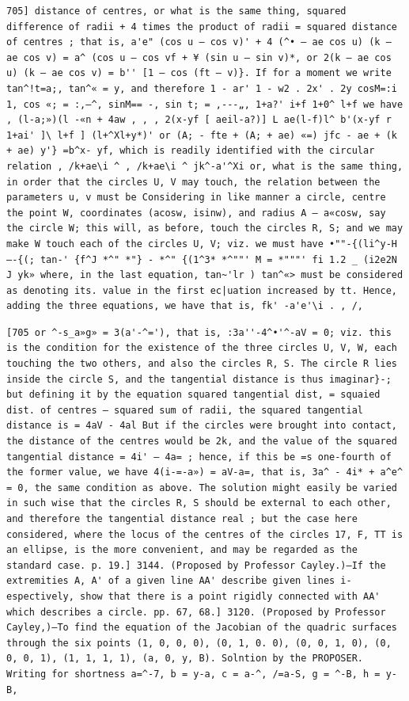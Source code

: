 \documentclass[11pt,a4paper]{book}
\begin{document}
\newpage
\setcounter{page}{567}
\begin{verbatim}
705] distance of centres, or what is the same thing, squared difference of radii + 4 times the product of radii = squared distance of centres ; that is, a'e" (cos u — cos v)' + 4 (^• — ae cos u) (k — ae cos v) = a^ (cos u — cos vf + ¥ (sin u — sin v)*, or 2(k — ae cos u) (k — ae cos v) = b'' [1 — cos (ft — v)}. If for a moment we write tan^!t=a;, tan^« = y, and therefore 1 - ar' 1 - w2 . 2x' . 2y cosM=:i 1, cos «; = :,—^, sinM== -, sin t; = ,---„, 1+a?' i+f 1+0^ l+f we have , (l-a;»)(l -«n + 4aw , , , 2(x-yf [ aeil-a?)] L ae(l-f)l^ b'(x-yf r 1+ai' ]\ l+f ] (l+^Xl+y*)' or (A; - fte + (A; + ae) «=) jfc - ae + (k + ae) y'} =b^x- yf, which is readily identified with the circular relation , /k+ae\i ^ , /k+ae\i ^ jk^-a'^Xi or, what is the same thing, in order that the circles U, V may touch, the relation between the parameters u, v must be Considering in like manner a circle, centre the point W, coordinates (acosw, isinw), and radius A — a«cosw, say the circle W; this will, as before, touch the circles R, S; and we may make W touch each of the circles U, V; viz. we must have •""-{(li^y-H—-{(; tan-' {f^J *^" *"} - *^" {(1^3* *^""' M = *"""' fi 1.2 _ (i2e2N J yk» where, in the last equation, tan~'lr ) tan^«> must be considered as denoting its. value in the first ec|uation increased by tt. Hence, adding the three equations, we have that is, fk' -a'e'\i . , /, 
\end{verbatim}

\newpage
\setcounter{page}{568}
\begin{verbatim}
[705 or ^-s_a»g» = 3(a'-^='), that is, :3a''-4^•'^-aV = 0; viz. this is the condition for the existence of the three circles U, V, W, each touching the two others, and also the circles R, S. The circle R lies inside the circle S, and the tangential distance is thus imaginar}-; but defining it by the equation squared tangential dist, = squaied dist. of centres — squared sum of radii, the squared tangential distance is = 4aV - 4al But if the circles were brought into contact, the distance of the centres would be 2k, and the value of the squared tangential distance = 4i' — 4a= ; hence, if this be =s one-fourth of the former value, we have 4(i-=-a») = aV-a=, that is, 3a^ - 4i* + a^e^ = 0, the same condition as above. The solution might easily be varied in such wise that the circles R, S should be external to each other, and therefore the tangential distance real ; but the case here considered, where the locus of the centres of the circles 17, F, TT is an ellipse, is the more convenient, and may be regarded as the standard case. p. 19.] 3144. (Proposed by Professor Cayley.)—If the extremities A, A' of a given line AA' describe given lines i-espectively, show that there is a point rigidly connected with AA' which describes a circle. pp. 67, 68.] 3120. (Proposed by Professor Cayley,)—To find the equation of the Jacobian of the quadric surfaces through the six points (1, 0, 0, 0), (0, 1, 0. 0), (0, 0, 1, 0), (0, 0, 0, 1), (1, 1, 1, 1), (a, 0, y, B). Solntion by the PROPOSER. Writing for shortness a=^-7, b = y-a, c = a-^, /=a-S, g = ^-B, h = y-B, 
\end{verbatim}
\end{document}
